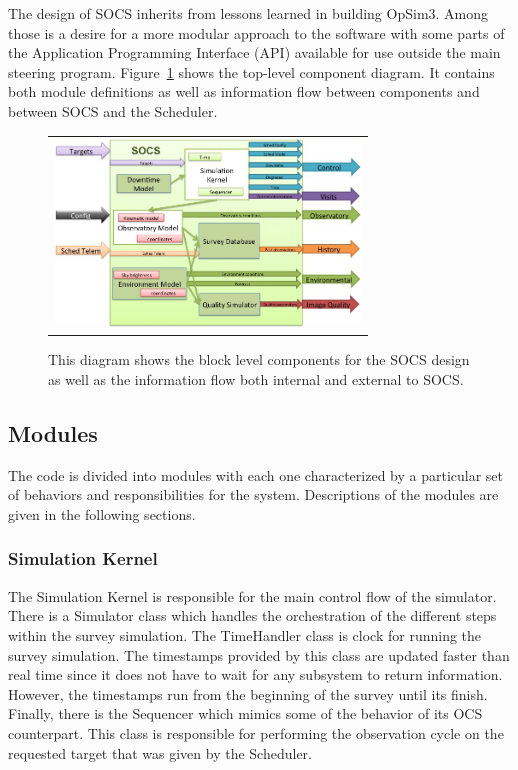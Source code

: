 \documentclass[]{spie}  %
\begin{document}
The design of SOCS inherits from lessons learned in building OpSim3. Among those is a desire for a more modular approach to the software with some parts of the Application Programming Interface (API) available for use outside the main steering program. Figure~\ref{fig:comparch} shows the top-level component diagram. It contains both module definitions as well as information flow between components and between SOCS and the Scheduler.

\begin{figure} [ht]
\begin{center}
\begin{tabular}{c}
\includegraphics[height=5cm]{CompArch.png}
\end{tabular}
\end{center}
\caption[example]
{ \label{fig:comparch} 
This diagram shows the block level components for the SOCS design as well as the information flow both internal and external to SOCS.}
\end{figure}

\subsection{Modules}

The code is divided into modules with each one characterized by a particular set of behaviors and responsibilities for the system. Descriptions of the modules are given in the following sections.

\subsubsection{Simulation Kernel}

The Simulation Kernel is responsible for the main control flow of the simulator. There is a Simulator class which handles the orchestration of the different steps within the survey simulation. The TimeHandler class is clock for running the survey simulation. The timestamps provided by this class are updated faster than real time since it does not have to wait for any subsystem to return information. However, the timestamps run from the beginning of the survey until its finish. Finally, there is the Sequencer which mimics some of the behavior of its OCS counterpart. This class is responsible for performing the observation cycle on the requested target that was given by the Scheduler. 
\end{document}
